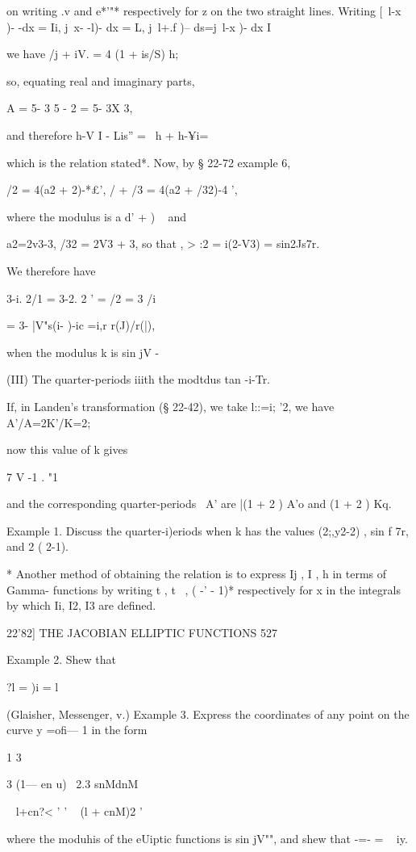 on writing .v and e*'"* respectively for z on the two straight lines.
Writing [\ l-x )- -dx = Ii, j\ x- -l)- dx = L, j\ l+.f )-- ds=j\ l-x
)- dx I

we have /j + iV. = 4 (1 + is/S) h;

so, equating real and imaginary parts,

A = 5- 3 5 - 2 = 5- 3X 3,

and therefore h-V I - Lis'' = \ h + h-¥i=

which is the relation stated*. Now, by § 22-72 example 6,

/2 = 4(a2 + 2)-*£', / + /3 = 4(a2 + /32)-4 ',

where the modulus is a d' + ) ~ and

a2=2v3-3, /32 = 2V3 + 3, so that , > :2 = i(2-V3) = sin2Js7r.

We therefore have

3-i. 2/1 = 3-2. 2 ' = /2 = 3 /i

= 3- |V"s(i- )-ic =i,r r(J)/r(|),

when the modulus k is sin jV -

(III) The quarter-periods iiith the modtdus tan -i-Tr.

If, in Landen's transformation (§ 22-42), we take l::=i; '2, we have
A'/A=2K'/K=2;

now this value of k gives

7 V -1 . "1

and the corresponding quarter-periods \, A' are |(1 + 2 ) A'o and (1 +
2 ) Kq.

Example 1. Discuss the quarter-i)eriods when k has the values
(2;,y2-2) , sin f 7r, and 2 ( 2-1).

* Another method of obtaining the relation is to express Ij , I , h in
terms of Gamma- functions by writing t , t~ , ( -' - 1)* respectively
for x in the integrals by which Ii, I2, I3 are defined.

22'82] THE JACOBIAN ELLIPTIC FUNCTIONS 527

Example 2. Shew that

?l = )i = l

(Glaisher, Messenger, v.) Example 3. Express the coordinates of any
point on the curve y =ofi— 1 in the form

1 3

3 (1— en u) \ 2.3 snMdnM

 ~ l+cn?< ' ' ~ (l + cnM)2 '

where the moduhis of the eUiptic functions is sin jV"", and shew that
-=- = ~ iy.

